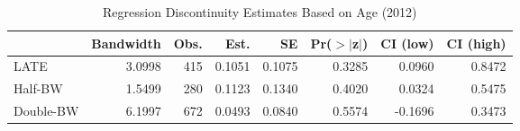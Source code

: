 \begin{table}[ht]
\centering
\begin{tabular}{lrrrrrrr}
  \hline
 & Bandwidth & Obs. & Est. & SE & Pr($>$$|$z$|$) & CI (low) & CI (high) \\ 
  \hline
LATE & 3.0998 & 415 & 0.1051 & 0.1075 & 0.3285 & 0.0960 & 0.8472 \\ 
  Half-BW & 1.5499 & 280 & 0.1123 & 0.1340 & 0.4020 & 0.0324 & 0.5475 \\ 
  Double-BW & 6.1997 & 672 & 0.0493 & 0.0840 & 0.5574 & -0.1696 & 0.3473 \\ 
   \hline
\end{tabular}
\caption{Regression Discontinuity Estimates Based on Age (2012)} 
\label{tab:rd2012y}
\end{table}
